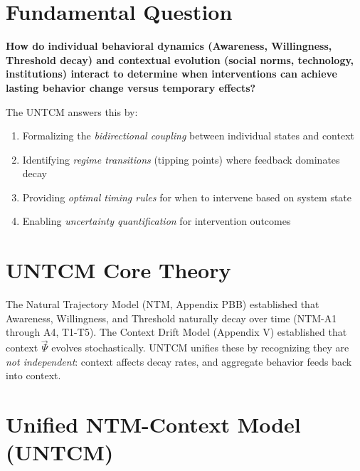 \section{Fundamental Question}
\label{sec:untcm-fundamental}

\begin{tcolorbox}[colback=red!5!white,colframe=red!75!black,title=Fundamental Question]
\textbf{How do individual behavioral dynamics (Awareness, Willingness, Threshold decay) and contextual evolution (social norms, technology, institutions) interact to determine when interventions can achieve lasting behavior change versus temporary effects?}
\end{tcolorbox}

The UNTCM answers this by:
\begin{enumerate}[nosep]
    \item Formalizing the \emph{bidirectional coupling} between individual states and context
    \item Identifying \emph{regime transitions} (tipping points) where feedback dominates decay
    \item Providing \emph{optimal timing rules} for when to intervene based on system state
    \item Enabling \emph{uncertainty quantification} for intervention outcomes
\end{enumerate}

\section{UNTCM Core Theory}
\label{sec:untcm-core}

The Natural Trajectory Model (NTM, Appendix PBB) established that Awareness, Willingness, and Threshold naturally decay over time (NTM-A1 through A4, T1-T5). The Context Drift Model (Appendix V) established that context $\vec{\Psi}$ evolves stochastically. UNTCM unifies these by recognizing they are \emph{not independent}: context affects decay rates, and aggregate behavior feeds back into context.


\section{Unified NTM-Context Model (UNTCM)}
\label{sec:untcm}

